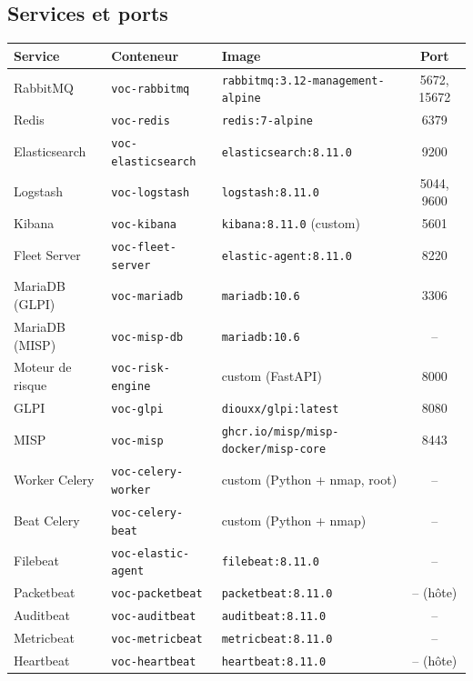 \subsection{Services et ports}

\begin{center}
\small
\begin{longtable}{@{}l l l c@{}}
\toprule
\textbf{Service} & \textbf{Conteneur} & \textbf{Image} & \textbf{Port} \\
\midrule
\endhead
\bottomrule
\endlastfoot
RabbitMQ & \texttt{voc-rabbitmq} & \texttt{rabbitmq:3.12-management-alpine} & 5672, 15672 \\
Redis & \texttt{voc-redis} & \texttt{redis:7-alpine} & 6379 \\
Elasticsearch & \texttt{voc-elasticsearch} & \texttt{elasticsearch:8.11.0} & 9200 \\
Logstash & \texttt{voc-logstash} & \texttt{logstash:8.11.0} & 5044, 9600 \\
Kibana & \texttt{voc-kibana} & \texttt{kibana:8.11.0} (custom) & 5601 \\
Fleet Server & \texttt{voc-fleet-server} & \texttt{elastic-agent:8.11.0} & 8220 \\
MariaDB (GLPI) & \texttt{voc-mariadb} & \texttt{mariadb:10.6} & 3306 \\
MariaDB (MISP) & \texttt{voc-misp-db} & \texttt{mariadb:10.6} & -- \\
Moteur de risque & \texttt{voc-risk-engine} & custom (FastAPI) & 8000 \\
GLPI & \texttt{voc-glpi} & \texttt{diouxx/glpi:latest} & 8080 \\
MISP & \texttt{voc-misp} & \texttt{ghcr.io/misp/misp-docker/misp-core} & 8443 \\
Worker Celery & \texttt{voc-celery-worker} & custom (Python + nmap, root) & -- \\
Beat Celery & \texttt{voc-celery-beat} & custom (Python + nmap) & -- \\
Filebeat & \texttt{voc-elastic-agent} & \texttt{filebeat:8.11.0} & -- \\
Packetbeat & \texttt{voc-packetbeat} & \texttt{packetbeat:8.11.0} & -- (h\^ote) \\
Auditbeat & \texttt{voc-auditbeat} & \texttt{auditbeat:8.11.0} & -- \\
Metricbeat & \texttt{voc-metricbeat} & \texttt{metricbeat:8.11.0} & -- \\
Heartbeat & \texttt{voc-heartbeat} & \texttt{heartbeat:8.11.0} & -- (h\^ote) \\
\bottomrule
\end{longtable}
\end{center}

